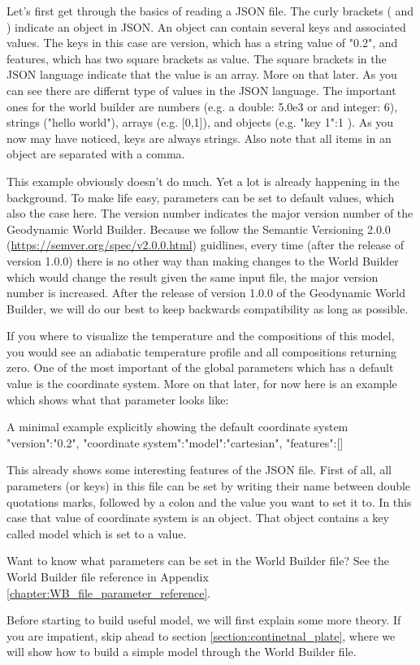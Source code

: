 \documentclass{book}
\newcommand{\GWB}{{Geodynamic World Builder}}
\newcommand{\WB}{{World Builder}}
\begin{document}
Let's first get through the basics of reading a JSON file. The curly brackets ({ and }) indicate an object in JSON. An object can contain several keys and associated values. The keys in this case are version, which has a string value of "0.2", and features, which has two square brackets as value. The square brackets in the JSON language indicate that the value is an array. More on that later. As you can see there are differnt type of values in the JSON language. The important ones for the world builder are numbers (e.g. a double: 5.0e3 or and integer: 6), strings ("hello world"), arrays (e.g. [0,1]),  and objects (e.g. { "key 1":1 }). As you now may have noticed, keys are always strings. Also note that all items in an object are separated with a comma.

This example obviously doesn't do much. Yet a lot is already happening in the background. To make life easy, parameters can be set to default values, which also the case here. The version number indicates the major version number of the \GWB{}. Because we follow the Semantic Versioning 2.0.0 (\url{https://semver.org/spec/v2.0.0.html}) guidlines, every time (after the release of version 1.0.0) there is no other way than making changes to the \WB{} which would change the result given the same input file, the major version number is increased. After the release of version 1.0.0 of the \GWB{}, we will do our best to keep backwards compatibility as long as possible.

If you where to visualize the temperature and the compositions of this model, you would see an adiabatic temperature profile and all compositions returning zero. One of the most important of the global parameters which has a default value is the coordinate system. More on that later, for now here is an example which shows what that parameter looks like:

\begin{javascriptcode}[label={lst:code_minimal_example_default_coordinate_system}]{A minimal example explicitly showing the default coordinate system}{}
{
  "version":"0.2",
  "coordinate system":{"model":"cartesian"},
  "features":[]
}
\end{javascriptcode}

This already shows some interesting features of the JSON file. First of all, all parameters (or keys) in this file can be set by writing their name between double quotations marks, followed by a colon and the value you want to set it to. In this case that value of coordinate system is an object. That object contains a key called model which is set to a value.
\begin{remark}
Want to know what parameters can be set in the \WB{} file? See the \WB{} file reference in Appendix \ref{chapter:WB_file_parameter_reference}.
\end{remark}
\begin{remark}
Before starting to build useful model, we will first explain some more theory. If you are impatient, skip ahead to section \ref{section:continetnal_plate}, where we will show how to build a simple model through the \WB{} file. 
\end{remark}
\end{document}
